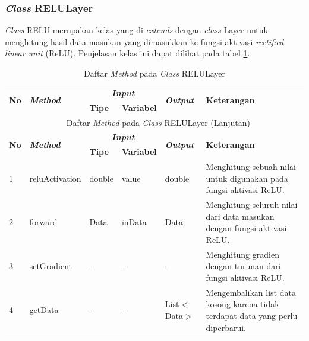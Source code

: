 \subsubsection{\textit{Class} RELULayer}
\noindent \textit{Class} RELU merupakan kelas yang di-\textit{extends} dengan \textit{class} Layer untuk menghitung hasil data masukan yang dimasukkan ke fungsi aktivasi \textit{rectified linear unit} (ReLU). Penjelasan kelas ini dapat dilihat pada tabel \ref{tbl:classRELULayer}.
\begingroup
\setlength{\LTleft}{-20cm plus -1fill}
\setlength{\LTright}{\LTleft}
\begin{small}
\begin{longtable}{|p{0.4cm}|p{2cm}|p{1.8cm}|p{1.8cm}|p{1.7cm}|p{3.55cm}|}
	\caption{Daftar \textit{Method} pada \textit{Class} RELULayer \label{tbl:classRELULayer}}\\
	\hline
	\multirow{2}{*}{\textbf{No}} & \multirow{2}{*}{\textit{\textbf{Method}}} & \multicolumn{2}{c|}{\textit{\textbf{Input}}} & \multirow{2}{*}{\textit{\textbf{Output}}} & 
	\multirow{2}{*}{\textbf{Keterangan}}\\
	\cline{3-4}
	& & \textbf{Tipe} & \textbf{Variabel} & & \\
	\endfirsthead
	\multicolumn{6}{c}{\textbf{\tablename~\thetable} Daftar \textit{Method} pada \textit{Class} RELULayer (Lanjutan)} \\
	\hline
	\multirow{2}{*}{\textbf{No}} & \multirow{2}{*}{\textit{\textbf{Method}}} & \multicolumn{2}{c|}{\textit{\textbf{Input}}} & \multirow{2}{*}{\textit{\textbf{Output}}} & 
	\multirow{2}{*}{\textbf{Keterangan}}\\
	\cline{3-4}
	& & \textbf{Tipe} & \textbf{Variabel} & & \\
	\endhead
	\hline
	1 & reluActivation & double & value & double & Menghitung sebuah nilai untuk digunakan pada fungsi aktivasi ReLU.\\
	\hline
	2 & forward & Data & inData & Data & Menghitung seluruh nilai dari data masukan dengan fungsi aktivasi ReLU.\\
	\hline
	3 & setGradient & - & - & - & Menghitung gradien dengan turunan dari fungsi aktivasi ReLU.\\
	\hline
	4 & getData & - & - & List$<$Data$>$ & Mengembalikan list data kosong karena tidak terdapat data yang perlu diperbarui.\\
	\hline
\end{longtable}
\end{small}
\endgroup

